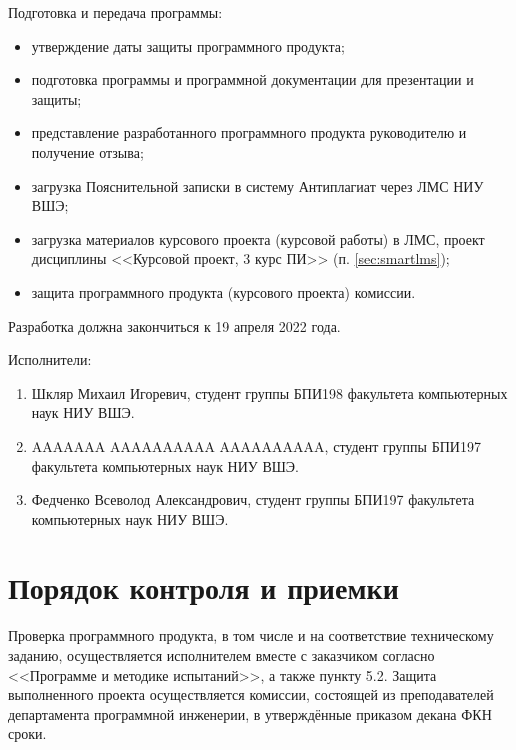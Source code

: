 \documentclass[a4paper,12pt,reqno]{article}
\begin{document}
  Подготовка и передача программы:
  \begin{itemize}
    \item утверждение даты защиты программного продукта;
    \item подготовка программы и программной документации для презентации и защиты;
    \item представление разработанного программного продукта руководителю и получение отзыва;
    \item загрузка Пояснительной записки в систему Антиплагиат через ЛМС НИУ ВШЭ;
    \item загрузка материалов курсового проекта (курсовой работы) в ЛМС, проект дисциплины <<Курсовой проект, 3 курс ПИ>> (п. \ref{sec:smartlms});
    \item защита программного продукта (курсового проекта) комиссии.
  \end{itemize}
  Разработка должна закончиться к 19 апреля 2022 года.

  Исполнители:
  \begin{enumerate}
    \item Шкляр Михаил Игоревич, студент группы БПИ198 факультета компьютерных наук НИУ ВШЭ.
    \item AAAAAAA AAAAAAAAAA AAAAAAAAAA, студент группы БПИ197 факультета компьютерных наук НИУ ВШЭ.
    \item Федченко Всеволод Александрович, студент группы БПИ197 факультета компьютерных наук НИУ ВШЭ.
  \end{enumerate}

  \section{Порядок контроля и приемки}
  Проверка программного продукта, в том числе и на соответствие техническому заданию,
  осуществляется исполнителем вместе с заказчиком согласно <<Программе и методике испытаний>>, а также пункту 5.2.
  Защита выполненного проекта осуществляется комиссии, состоящей из преподавателей департамента программной инженерии,
  в утверждённые приказом декана ФКН сроки.

  \begin{CRTbibliography}
  \end{CRTbibliography}

  \CRTlistRegistration
\end{document}
